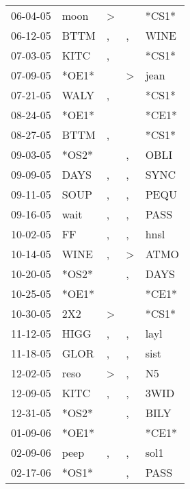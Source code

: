 \begin{supertabular}{lllll}
 06-04-05 &   moon &     \textgreater &                  &  *CS1* \\
 06-12-05 &   BTTM &                , &                , &   WINE \\
 07-03-05 &   KITC &                , &                  &  *CS1* \\
 07-09-05 &  *OE1* &                  &     \textgreater &   jean \\
 07-21-05 &   WALY &                , &                  &  *CS1* \\
 08-24-05 &  *OE1* &                  &                  &  *CE1* \\
 08-27-05 &   BTTM &                , &                  &  *CS1* \\
 09-03-05 &  *OS2* &                  &                , &   OBLI \\
 09-09-05 &   DAYS &                , &                , &   SYNC \\
 09-11-05 &   SOUP &                , &                , &   PEQU \\
 09-16-05 &   wait &                , &                , &   PASS \\
 10-02-05 &     FF &                , &                , &   hnsl \\
 10-14-05 &   WINE &                , &     \textgreater &   ATMO \\
 10-20-05 &  *OS2* &                  &                , &   DAYS \\
 10-25-05 &  *OE1* &                  &                  &  *CE1* \\
 10-30-05 &    2X2 &     \textgreater &                  &  *CS1* \\
 11-12-05 &   HIGG &                , &                , &   layl \\
 11-18-05 &   GLOR &                , &                , &   sist \\
 12-02-05 &   reso &     \textgreater &                , &     N5 \\
 12-09-05 &   KITC &                , &                , &   3WID \\
 12-31-05 &  *OS2* &                  &                , &   BILY \\
 01-09-06 &  *OE1* &                  &                  &  *CE1* \\
 02-09-06 &   peep &                , &                , &   sol1 \\
 02-17-06 &  *OS1* &                  &                , &   PASS \\

\end{supertabular}
